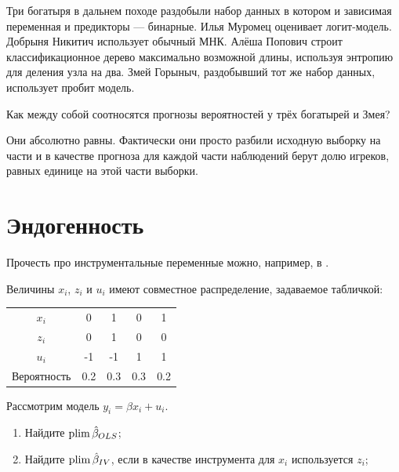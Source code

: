 \begin{problem}
Три богатыря в дальнем походе раздобыли набор данных в котором и зависимая переменная и предикторы — бинарные.
Илья Муромец оценивает логит-модель. Добрыня Никитич использует обычный МНК. 
Алёша Попович строит классификационное дерево максимально возможной длины,
используя энтропию для деления узла на два. 
Змей Горыныч, раздобывший тот же набор данных, использует пробит модель.



Как между собой соотносятся прогнозы вероятностей у трёх богатырей и Змея?
\begin{sol}
  Они абсолютно равны. Фактически они просто разбили исходную выборку на части и в качестве 
  прогноза для каждой части наблюдений берут долю игреков, равных единице на этой части выборки.
\end{sol}
\end{problem}


\section{Эндогенность}

Прочесть про инструментальные переменные можно, например, в \cite{kurt2021notes}.


\begin{problem}
Величины $x_i$, $z_i$ и $u_i$ имеют совместное распределение, задаваемое табличкой:

\begin{tabular}{ccccc}
  \toprule
  $x_i$ & 0 & 1 & 0 & 1 \\
  $z_i$ & 0 & 1 & 0 & 0 \\
  $u_i$ & -1 & -1 & 1 & 1 \\
  \midrule
  Вероятность & 0.2 & 0.3 & 0.3 & 0.2 \\
  \bottomrule
\end{tabular}

Рассмотрим модель $y_i = \beta x_i + u_i$.

\begin{enumerate}
  \item Найдите $\operatorname*{plim} \hat{\beta}_{OLS}$;
  \item Найдите $\operatorname*{plim} \hat{\beta}_{IV}$, если в качестве инструмента для $x_i$ используется $z_i$;
\end{enumerate}

\begin{sol}
\end{sol}
\end{problem}

